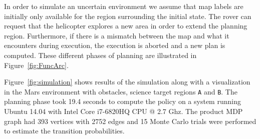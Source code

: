 \documentclass[letterpaper]{article} %
\begin{document}
In order to simulate an uncertain environment we assume that map labels are initially only available for the region surrounding the initial state. The rover can request that the helicopter explores a new area in order to extend the planning region. Furthermore, if there is a mismatch between the map and what it encounters during execution, the execution is aborted and a new plan is computed. These different phases of planning are illustrated in Figure~\ref{fig:FuncArc}.

Figure~\ref{fig:simulation} shows results of the simulation along with a visualization in the Mars environment with obstacles, science target regions \texttt{A} and \texttt{B}. The planning phase took 19.4 seconds to compute the policy on a system running Ubuntu 14.04 with Intel Core i7-6820HQ CPU @ 2.7 Ghz. The product MDP graph had 393 vertices with 2752 edges and 15 Monte Carlo trials were performed to estimate the transition probabilities.


	
\end{document}
